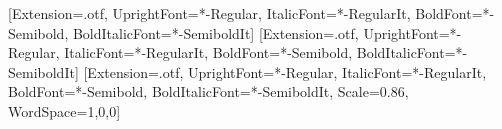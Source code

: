 
\setmainfont{SourceSerif4}[Extension=.otf, UprightFont=*-Regular, ItalicFont=*-RegularIt,
  BoldFont=*-Semibold, BoldItalicFont=*-SemiboldIt]
\setsansfont{SourceSans3}[Extension=.otf, UprightFont=*-Regular, ItalicFont=*-RegularIt,
  BoldFont=*-Semibold, BoldItalicFont=*-SemiboldIt]
\setmonofont{SourceCodePro}[Extension=.otf, UprightFont=*-Regular, ItalicFont=*-RegularIt,
  BoldFont=*-Semibold, BoldItalicFont=*-SemiboldIt, Scale=0.86, WordSpace={1,0,0}]

\usepackage{etoolbox}
\usepackage{xcolor}
\usepackage{booktabs}
\usepackage{tabularx}
\usepackage[skins,breakable]{tcolorbox}
\usepackage{fvextra}
\raggedbottom
{}
\setcounter{tocdepth}{0}

